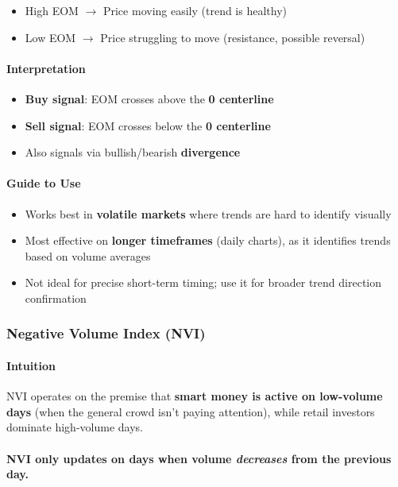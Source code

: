\documentclass[12pt,openany]{book}
\begin{document}
\begin{itemize}[leftmargin=*]
    \item High EOM \(\rightarrow\) Price moving easily (trend is healthy)
    \item Low EOM \(\rightarrow\) Price struggling to move (resistance, possible reversal)
\end{itemize}

\paragraph{Interpretation}
\begin{itemize}[leftmargin=*]
    \item \textbf{Buy signal}: EOM crosses above the \textbf{0 centerline}
    \item \textbf{Sell signal}: EOM crosses below the \textbf{0 centerline}
    \item Also signals via bullish/bearish \textbf{divergence}
\end{itemize}

\paragraph{Guide to Use}
\begin{itemize}[leftmargin=*]
    \item Works best in \textbf{volatile markets} where trends are hard to identify visually
    \item Most effective on \textbf{longer timeframes} (daily charts), as it identifies trends based on volume averages
    \item Not ideal for precise short-term timing; use it for broader trend direction confirmation
\end{itemize}

\subsubsection{Negative Volume Index (NVI)}

\paragraph{Intuition}
NVI operates on the premise that \textbf{smart money is active on low-volume days} (when the general crowd isn't paying attention), while retail investors dominate high-volume days.

\paragraph{NVI only updates on days when volume \emph{decreases} from the previous day.}
\end{document}
